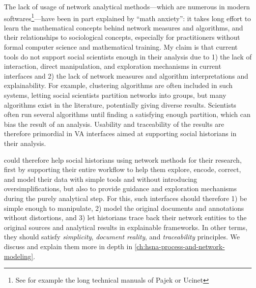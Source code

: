 The lack of usage of network analytical methods---which are numerous in modern \sna softwares\footnote{See for example the long  technical manuals of Pajek\cite{pajek} or Ucinet\cite{johnsonUCINETSoftwareTool1987}}---have been in part explained by ``math anxiety''\cite{paxtonDollarsSenseConvincing2006}: it takes long effort to learn the mathematical concepts behind network measures and algorithms, and their relationships to sociological concepts\cite{rollingerProlegomenaProblemsPerspectives2020}, especially for practitioners without formal computer science and mathematical training.
My claim is that current \hsna tools do not support social scientists enough in their analysis due to 1) the lack of interaction, direct manipulation, and exploration mechanisms in current interfaces and 2) the lack of network measures and algorithm interpretations and explainability.
For example, clustering algorithms are often included in such systems, letting social scientists partition networks into groups, but many algorithms exist in the literature, potentially giving diverse results.
Scientists often run several algorithms until finding a satisfying enough partition, which can bias the result of an analysis\cite{pisterIntegratingPriorKnowledge2021}.
Usability and traceability of the results are therefore primordial in VA interfaces aimed at supporting social historians in their analysis.

\va could therefore help social historians using network methods for their research, first by supporting their entire workflow to help them explore, encode, correct, and model their data with simple tools and without introducing oversimplifications, but also to provide guidance and exploration mechanisms during the purely analytical step.
For this, such interfaces should therefore 1) be simple enough to manipulate, 2) model the original documents and annotations without distortions, and 3) let historians trace back their network entities to the original sources and analytical results in explainable frameworks.
In other terms, they should satisfy \emph{simplicity}, \emph{document reality}, and \emph{traceability} principles.
We discuss and explain them more in depth in \autoref{ch:hsna-process-and-network-modeling}.






